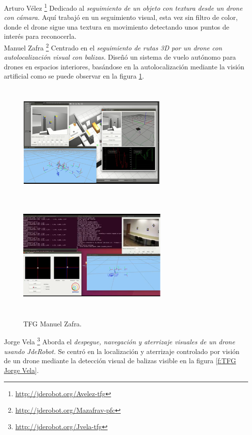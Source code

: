 \hspace{1cm} Arturo Vélez \footnote{\url{http://jderobot.org/Avelez-tfg}} \cite{ArturoVelez} Dedicado al \textit{seguimiento de un objeto con textura desde un drone con cámara.} Aquí trabajó en un seguimiento visual, esta vez sin filtro de color, donde el drone sigue una textura en movimiento detectando unos puntos de interés para reconocerla.
\\

\hspace{1cm} Manuel Zafra \footnote{\url{http://jderobot.org/Mazafrav-pfc}} \cite{ManuelZafra} Centrado en el \textit{seguimiento de rutas 3D por un drone con autolocalización visual con balizas.} Diseñó un sistema de vuelo autónomo para drones en espacios interiores, basándose en la autolocalización mediante la visión artificial como se puede observar en la figura \ref{f:TFG Manuel Zafra}.
\\

\begin{figure}[H]
 \centering
    \includegraphics[width=7.5cm,height=6cm]{imag/IMG9.png}
    \includegraphics[width=7.5cm,height=6cm]{imag/IMG10.png}
 \caption{TFG Manuel Zafra.}
 \label{f:TFG Manuel Zafra}
\end{figure} 

\hspace{1cm} Jorge Vela \footnote{\url{http://jderobot.org/Jvela-tfg}} \cite{JorgeVela} Aborda el \textit{despegue, navegación y aterrizaje visuales de un drone usando JdeRobot.} Se centró en la localización y aterrizaje controlado por visión de un drone mediante la detección visual de balizas visible en la figura \ref{f:TFG Jorge Vela}.

